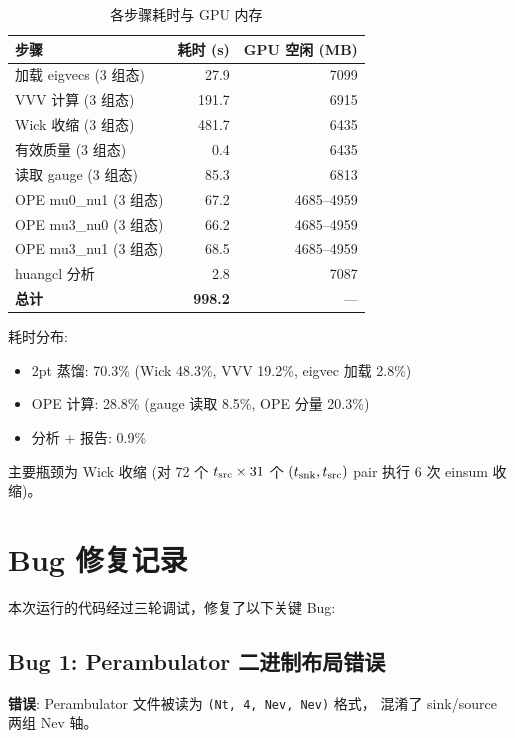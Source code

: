 \documentclass[12pt,a4paper]{ctexart}
\begin{document}
\begin{table}[htbp]
\centering
\caption{各步骤耗时与 GPU 内存}
\label{tab:perf}
\begin{tabular}{lrr}
\toprule
\textbf{步骤}                & \textbf{耗时 (s)} & \textbf{GPU 空闲 (MB)} \\
\midrule
加载 eigvecs (3 组态)       & 27.9  & 7099 \\
VVV 计算 (3 组态)           & 191.7 & 6915 \\
Wick 收缩 (3 组态)          & 481.7 & 6435 \\
有效质量 (3 组态)           & 0.4   & 6435 \\
\addlinespace
读取 gauge (3 组态)         & 85.3  & 6813 \\
OPE mu0\_nu1 (3 组态)       & 67.2  & 4685--4959 \\
OPE mu3\_nu0 (3 组态)       & 66.2  & 4685--4959 \\
OPE mu3\_nu1 (3 组态)       & 68.5  & 4685--4959 \\
\addlinespace
huangcl 分析                & 2.8   & 7087 \\
\addlinespace
\textbf{总计}               & \textbf{998.2} & --- \\
\bottomrule
\end{tabular}
\end{table}

\noindent
耗时分布:
\begin{itemize}
  \item 2pt 蒸馏: 70.3\% (Wick 48.3\%, VVV 19.2\%, eigvec 加载 2.8\%)
  \item OPE 计算: 28.8\% (gauge 读取 8.5\%, OPE 分量 20.3\%)
  \item 分析 + 报告: 0.9\%
\end{itemize}

主要瓶颈为 Wick 收缩 (对 72 个 $t_{\rm src} \times 31$ 个 $(t_{\rm snk}, t_{\rm src})$ pair
执行 6 次 einsum 收缩)。

\section{Bug 修复记录}

本次运行的代码经过三轮调试，修复了以下关键 Bug:

\subsection{Bug 1: Perambulator 二进制布局错误}
\textbf{错误}: Perambulator 文件被读为 \texttt{(Nt, 4, Nev, Nev)} 格式，
混淆了 sink/source 两组 Nev 轴。
\end{document}
